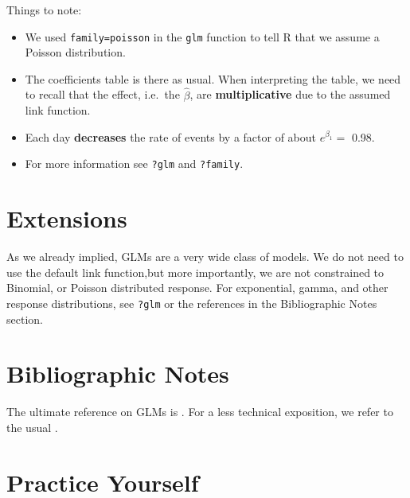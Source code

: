 \documentclass[]{book}
\providecommand{\tightlist}{%
  \setlength{\itemsep}{0pt}\setlength{\parskip}{0pt}}
\theoremstyle{definition}
\theoremstyle{definition}
\theoremstyle{definition}
\theoremstyle{remark}
\begin{document}
Things to note:

\begin{itemize}
\tightlist
\item
  We used \texttt{family=poisson} in the \texttt{glm} function to tell R
  that we assume a Poisson distribution.
\item
  The coefficients table is there as usual. When interpreting the table,
  we need to recall that the effect, i.e.~the \(\hat \beta\), are
  \textbf{multiplicative} due to the assumed link function.
\item
  Each day \textbf{decreases} the rate of events by a factor of about
  \(e^{\beta_1}=\) 0.98.
\item
  For more information see \texttt{?glm} and \texttt{?family}.
\end{itemize}

\section{Extensions}\label{extensions}

As we already implied, GLMs are a very wide class of models. We do not
need to use the default link function,but more importantly, we are not
constrained to Binomial, or Poisson distributed response. For
exponential, gamma, and other response distributions, see \texttt{?glm}
or the references in the Bibliographic Notes section.

\section{Bibliographic Notes}\label{bibliographic-notes-5}

The ultimate reference on GLMs is \citet{mccullagh1984generalized}. For
a less technical exposition, we refer to the usual
\citet{venables2013modern}.

\section{Practice Yourself}\label{practice-glm}
\end{document}
